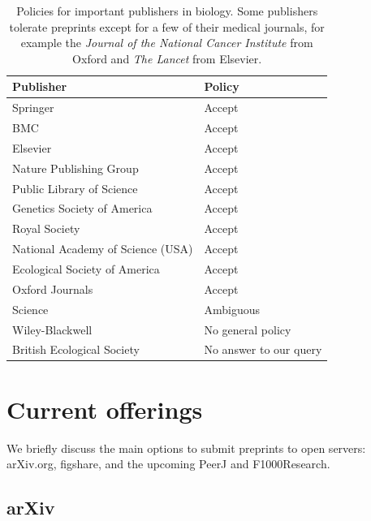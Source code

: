 \documentclass[letterpaper,twocolumn,superscriptaddress,showkeys,longbibliography]{revtex4-1}
\begin{document}
\begin{table}
    \centering
    \begin{tabular}{|ll|}
    \hline
    Publisher                                   & Policy \\
    \hline
    Springer                            	& Accept \\
    BMC                                 	& Accept \\
    Elsevier                            	& Accept \\
    Nature Publishing Group             	& Accept \\
    Public Library of Science           	& Accept \\
    Genetics Society of America                 & Accept \\
    Royal Society                       	& Accept \\
    National Academy of Science (USA)           & Accept \\
    Ecological Society of America       	& Accept \\
    Oxford Journals                             & Accept \\
    Science                             	& Ambiguous \\
    Wiley-Blackwell                       	& No general policy \\
    British Ecological Society                  & No answer to our query \\
    \hline
    \end{tabular}
    \caption{Policies for important publishers in biology. Some publishers
tolerate preprints except for a few of their medical journals, for example the
\emph{ Journal of the National Cancer Institute} from Oxford and \emph{The
Lancet} from Elsevier.}
    \label{table:policies}
\end{table}

\section{Current offerings}

We briefly discuss the main options to submit preprints to open servers:
arXiv.org, figshare, and the upcoming PeerJ and F1000Research.

\subsection{arXiv}
\end{document}
